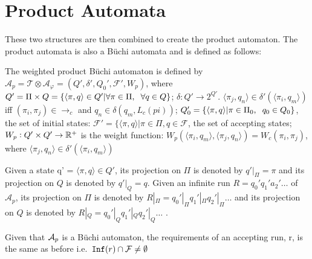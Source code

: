 \section{Product Automata}
These two structures are then combined to create the product automaton. The product automata is also a B\"{u}chi automata and is defined as follows:
\begin{definition}
The weighted product B\"{u}chi automaton is defined by $\mathcal{A}_p = \mathcal{T} \otimes \mathcal{A}_\varphi = (Q', \delta', Q_0', \mathcal{F}', W_p)$, where $Q' = \Pi \times Q = \{ \langle \pi, q \rangle \in Q' | \forall \pi \in \Pi, \hspace{0.2cm} \forall q \in Q \}$; $\delta: Q' \rightarrow 2^{Q'}$. $\langle \pi_j, q_n \rangle \in \delta' (\langle \pi_i, q_m \rangle )$ iff $(\pi_i , \pi_j ) \in \rightarrow_c$ and $q_n \in \delta (q_m, L_c(pi))$; $Q_0' = \{ \langle \pi , q \rangle | \pi \in \Pi_0, \hspace{0.2cm} q_0 \in Q_0\}$, the set of initial states: $\mathcal{F}' = \{ \langle \pi, q \rangle | \pi \in \Pi, q \in \mathcal{F}$, the set of accepting states; $W_p: Q' \times Q' \rightarrow \mathbb{R}^+$ is the weight function: $W_p(\langle \pi_i, q_m \rangle , \langle \pi_j, q_n \rangle ) = W_c (\pi_i, \pi_j)$, where $\langle \pi_j, q_n \rangle \in \delta' ( \langle \pi_i, q_m \rangle )$
\end{definition} 

Given a state q' = $\langle \pi, q \rangle \in Q'$, its projection on $\Pi$ is denoted by $q'|_\Pi = \pi$ and its projection on $Q$ is denoted by $q'|_Q = q$. Given an infinite run $R = q_0' q_1' a_2' \dots$ of $\mathcal{A}_p$, its projection on $\Pi$ is denoted by $R|_\Pi = q_0'|_\Pi q_1'|_\Pi q_2'|_\Pi \dots$ and its projection on $Q$ is denoted by $R|_Q  = q_0'|_Q q_1'|_Q q_2'|_Q \dots$ \cite{guo15}. 

Given that $\mathcal{A}_p$ is a B\"{u}chi automaton, the requirements of an accepting run, r, is the same as before i.e.\ $\texttt{Inf}(r) \cap \mathcal{F} \neq \emptyset$

%
%



